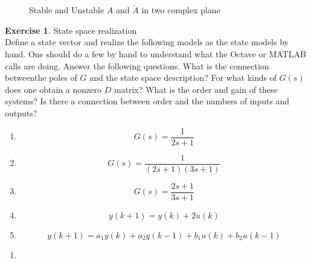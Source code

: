 \documentclass[11pt,a4paper]{report}
\theoremstyle{definition}\newtheorem{exercise}{Exercise}[chapter]
\begin{document}
\begin{answer}
\begin{figure}[htbp]
\begin{tikzpicture}[x=0.75pt,y=0.75pt,yscale=-1,xscale=1]
    
    \end{tikzpicture}
    
    \caption{Stable and Unstable $A$ and $\tilde A$ in two complex plane}
    \label{fig:exer1-9}
    \end{figure}
\end{answer}

\begin{exercise}State space realization\\
Define a state vector and realize the following models as the state models by hand. One should do a few by hand to understand what the Octave or MATLAB calls are doing. Answer the following questions. What is the connection betweenthe poles of $G$ and the state space description? For what kinds of $G(s)$ does one obtain a nonzero $D$ matrix? What is the order and gain of these systems? Is there a connection between order and the numbers of inputs and outputs?
\begin{enumerate}[label=(\alph*)]
    \item $$G(s)=\dfrac{1}{2s+1}$$
    \item $$G(s)=\dfrac{1}{(2s+1)(3s+1)}$$
    \item $$G(s)=\dfrac{2s+1}{3s+1}$$
    \item $$y(k+1)=y(k)+2u(k)$$
    \item $$y(k+1)=a_1 y(k)+a_2 y(k-1)+b_1 u(k)+b_2 u(k-1)$$
\end{enumerate}
\end{exercise}

\begin{answer}
\begin{enumerate}
    \item 
\end{enumerate}
\end{answer}


































\end{document}
